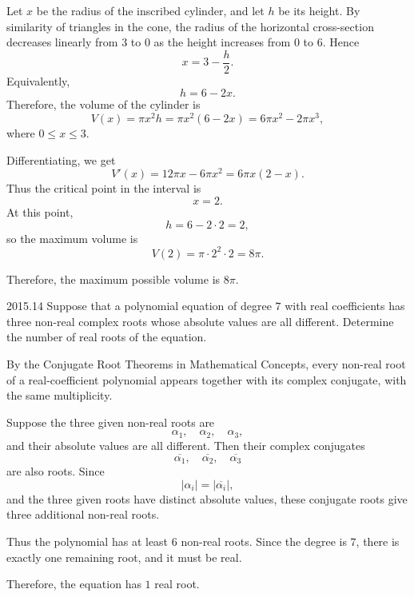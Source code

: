     \begin{solution}
        Let $x$ be the radius of the inscribed cylinder, and let $h$ be its height. By similarity of
        triangles in the cone, the radius of the horizontal cross-section decreases linearly from
        $3$ to $0$ as the height increases from $0$ to $6$. Hence
        \[
            x=3-\frac{h}{2}.
        \]
        Equivalently,
        \[
            h=6-2x.
        \]
        Therefore, the volume of the cylinder is
        \[
            V(x)
            =
            \pi x^2h
            =
            \pi x^2(6-2x)
            =
            6\pi x^2-2\pi x^3,
        \]
        where $0\leq x\leq 3$.

        Differentiating, we get
        \[
            V'(x)
            =
            12\pi x-6\pi x^2
            =
            6\pi x(2-x).
        \]
        Thus the critical point in the interval is
        \[
            x=2.
        \]
        At this point,
        \[
            h=6-2\cdot 2=2,
        \]
        so the maximum volume is
        \[
            V(2)
            =
            \pi\cdot 2^2\cdot 2
            =
            8\pi.
        \]

        Therefore, the maximum possible volume is $\boxed{8\pi}$.
    \end{solution}

    \begin{pastproblem}{2015.14}
        Suppose that a polynomial equation of degree $7$ with real coefficients has three non-real
        complex roots whose absolute values are all different. Determine the number of real roots of
        the equation.
    \end{pastproblem}

    \begin{solution}
        By the Conjugate Root Theorems in Mathematical Concepts, every non-real
        root of a real-coefficient polynomial appears together with its complex
        conjugate, with the same multiplicity.

        Suppose the three given non-real roots are
        \[
            \alpha_1,\quad \alpha_2,\quad \alpha_3,
        \]
        and their absolute values are all different. Then their complex conjugates
        \[
            \overline{\alpha_1},\quad
            \overline{\alpha_2},\quad
            \overline{\alpha_3}
        \]
        are also roots. Since
        \[
            |\alpha_i|=|\overline{\alpha_i}|,
        \]
        and the three given roots have distinct absolute values, these conjugate roots give three
        additional non-real roots.

        Thus the polynomial has at least $6$ non-real roots. Since the degree is $7$, there is
        exactly one remaining root, and it must be real.

        Therefore, the equation has $\boxed{1}$ real root.
    \end{solution}

